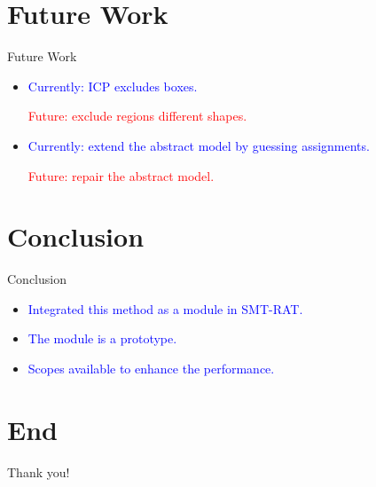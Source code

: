 \documentclass[]{beamer}
\begin{document}
\section{Future Work}
\begin{frame}{Future Work}
    \begin{itemize}
        \item \textcolor<1>{blue}{Currently: ICP excludes boxes.}\newline
        
        \textcolor<1>{red}{Future: exclude regions different shapes.}
        \bigskip
        \bigskip
        \item \textcolor<2>{blue}{Currently: extend the abstract model by guessing assignments.}\newline
        
        \textcolor<2>{red}{Future: repair the abstract model.}
    \end{itemize} 
\end{frame}

\section{Conclusion}
\begin{frame}{Conclusion}
    \begin{itemize}
        \item \textcolor<1>{blue}{Integrated this method as a module in SMT-RAT.}
        \bigskip
        \item \textcolor<1>{blue}{The module is a prototype.}
        \bigskip
        \item \textcolor<1>{blue}{Scopes available to enhance the performance.}
    \end{itemize}
\end{frame}

\section{End}
\begin{frame}{}
    \centering  
    \huge{Thank you!}
\end{frame}
\end{document}
